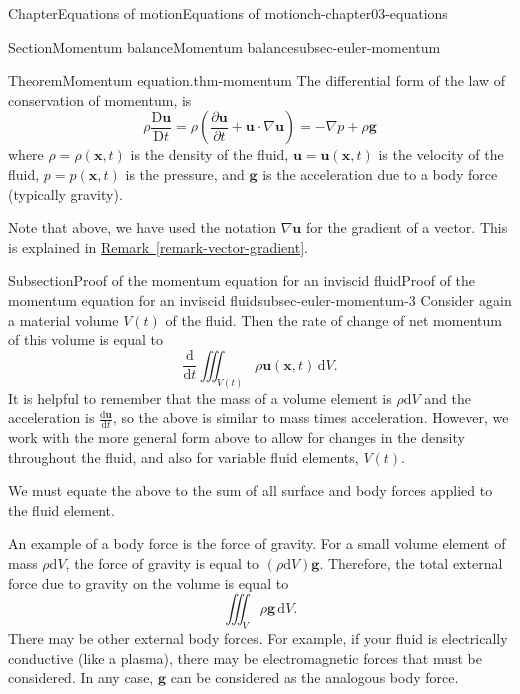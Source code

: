 \documentclass[oneside,10pt,]{book}
\newcommand{\xreffont}{\relax}
\numberwithin{equation}{section}
\newcommand{\de}{\mathrm{d}}
\newcommand{\dd}[2]{\frac{\de#1}{\de#2}}
\newcommand{\DD}[2]{\frac{\mathrm{D}#1}{\mathrm{D}#2}}
\newcommand{\pd}[2]{\frac{\partial#1}{\partial#2}}
\newcommand{\bx}{\boldsymbol{x}}
\newcommand{\bu}{\boldsymbol{u}}
\newcommand{\bg}{\boldsymbol{g}}
\begin{document}
\begin{chapterptx}{Chapter}{Equations of motion}{}{Equations of motion}{}{}{ch-chapter03-equations}
\begin{sectionptx}{Section}{Momentum balance}{}{Momentum balance}{}{}{subsec-euler-momentum}
\begin{introduction}{}
\begin{theorem}{Theorem}{Momentum equation.}{}{thm-momentum}
The differential form of the law of conservation of momentum, is%
\begin{equation}
\rho \DD{\bu}{t} = \rho \left(\pd{\bu}{t} + \bu \cdot \nabla\bu\right) = - \nabla p + \rho \bg \label{eqn-consvmoment}
\end{equation}
where \(\rho = \rho(\bx,t)\) is the density of the fluid, \(\bu = \bu(\bx, t)\) is the velocity of the fluid, \(p = p(\bx, t)\) is the pressure, and \(\bg\) is the acceleration due to a body force (typically gravity).%
\end{theorem}
Note that above, we have used the notation \(\nabla \bu\) for the gradient of a vector. This is explained in \hyperref[remark-vector-gradient]{Remark~{\xreffont\ref{remark-vector-gradient}}}.%
\end{introduction}%
%
%
\typeout{************************************************}
\typeout{************************************************}
%
\begin{subsectionptx}{Subsection}{Proof of the momentum equation for an inviscid fluid}{}{Proof of the momentum equation for an inviscid fluid}{}{}{subsec-euler-momentum-3}
Consider again a material volume \(V(t)\) of the fluid. Then the rate of change of net momentum of this volume is equal to%
\begin{equation}
\dd{}{t} \iiint_{V(t)} \rho \bu(\bx, t) \, \de{V}. \label{eqn-momentum1}
\end{equation}
It is helpful to remember that the mass of a volume element is \(\rho \de{V}\) and the acceleration is \(\dd{\bu}{t}\), so the above is similar to mass times acceleration. However, we work with the more general form above to allow for changes in the density throughout the fluid, and also for variable fluid elements, \(V(t)\).%
\par
We must equate the above to the sum of all surface and body forces applied to the fluid element.%
\par
An example of a body force is the force of gravity. For a small volume element of mass \(\rho \de{V}\), the force of gravity is equal to \((\rho \de{V})\bg\). Therefore, the total external force due to gravity on the volume is equal to%
\begin{equation}
\iiint_{V} \rho \bg \, \de{V}.\label{eqn-momentum2}
\end{equation}
There may be other external body forces. For example, if your fluid is electrically conductive (like a plasma), there may be electromagnetic forces that must be considered. In any case, \(\bg\) can be considered as the analogous body force.%

\end{subsectionptx}
\end{sectionptx}
\end{chapterptx}
\end{document}
